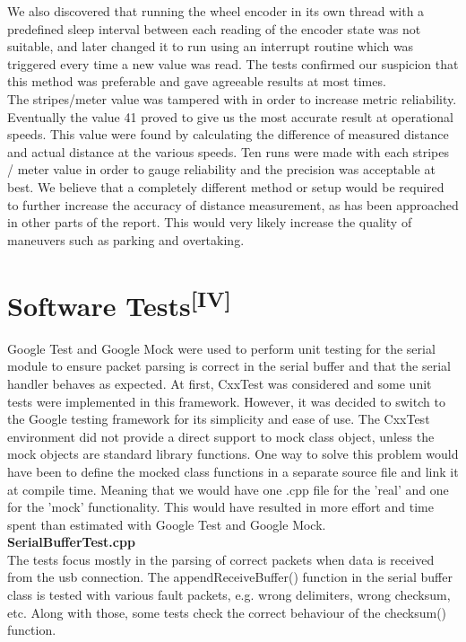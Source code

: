 \noindent
We also discovered that running the wheel encoder in its own thread with a
predefined sleep interval between each reading of the encoder state was not
suitable, and later changed it to run using an interrupt routine which was
triggered every time a new value was read. The tests confirmed our suspicion
that this method was preferable and gave agreeable results at most times.\\

\noindent
The stripes/meter value was tampered with in order to increase metric
reliability. Eventually the value 41 proved to give us the most accurate result
at operational speeds. This value were found by calculating the difference of
measured distance and actual distance at the various speeds. Ten runs were made
with each stripes / meter value in order to gauge reliability and the precision
was acceptable at best. We believe that a completely different method or setup
would be required to further increase the accuracy of distance measurement, as
has been approached in other parts of the report. This would very likely
increase the quality of maneuvers such as parking and overtaking.

\section[Software Tests]{Software Tests\textsuperscript{[IV]}}
Google Test and Google Mock were used to perform unit testing for the serial
module to ensure packet parsing is correct in the serial buffer and that the
serial handler behaves as expected. At first, CxxTest was considered and some
unit tests were implemented in this framework. However, it was decided to switch
to the Google testing framework for its simplicity and ease of use. The CxxTest
environment did not provide a direct support to mock class object, unless the
mock objects are standard library functions. One way to solve this problem would
have been to define the mocked class functions in a separate source file and
link it at compile time. Meaning that we would have one .cpp file for the 'real'
and one for the 'mock' functionality. This would have resulted in more effort
and time spent than estimated with Google Test and Google Mock.\\

\noindent
\textbf{SerialBufferTest.cpp}\\
The tests focus mostly in the parsing of correct packets when data is received
from the usb connection. The appendReceiveBuffer() function in the serial buffer
class is tested with various fault packets, e.g. wrong delimiters, wrong
checksum, etc. Along with those, some tests check the correct behaviour of the
checksum() function.\\

